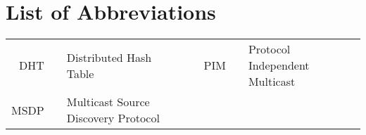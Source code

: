 \section*{List of Abbreviations}

\begin{tabular}{rp{0.2cm}lp{1cm}rp{0.2cm}l}
    DHT     & &  Distributed Hash Table   & & PIM     & &  Protocol Independent Multicast  \\
    MSDP     & &  Multicast Source Discovery Protocol                
\end{tabular}
